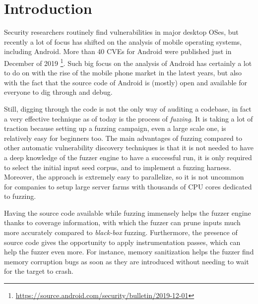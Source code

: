 \documentclass[a4paper,11pt,oneside]{report}
\begin{document}
\chapter{Introduction}

Security researchers routinely find vulnerabilities in major desktop OSes, but 
recently a lot of focus has shifted on the analysis of mobile operating 
systems, including Android.  More than 40 CVEs for Android were published just 
in December of 2019 
\footnote{\url{https://source.android.com/security/bulletin/2019-12-01}}.  Such 
big focus on the analysis of Android has certainly a lot to do on with the rise 
of the mobile phone market in the latest years, but also with the fact that the 
source code of Android is (mostly) open and available for everyone to dig 
through and debug.

Still, digging through the code is not the only way of auditing a codebase, in 
fact a very effective technique as of today is the process of \emph{fuzzing}.  
It is taking a lot of traction because setting up a fuzzing campaign, even a 
large scale one, is relatively easy for beginners too. The main advantages of 
fuzzing compared to other automatic vulnerability discovery techniques is that 
it is not needed to have a deep knowledge of the fuzzer engine to have a 
successful run, it is only required to select the initial input seed corpus, 
and to implement a fuzzing harness. Moreover, the approach is extremely easy to 
parallelize, so it is not uncommon for companies to setup large server farms 
with thousands of CPU cores dedicated to fuzzing.

Having the source code available while fuzzing immensely helps the fuzzer 
engine thanks to coverage information, with which the fuzzer can prune inputs 
much more accurately compared to \emph{black-box} fuzzing.  Furthermore, the 
presence of source code gives the opportunity to apply instrumentation passes, 
which can help the fuzzer even more.  For instance, memory sanitization helps 
the fuzzer find memory corruption bugs as soon as they are introduced without 
needing to wait for the target to crash. 
\end{document}
